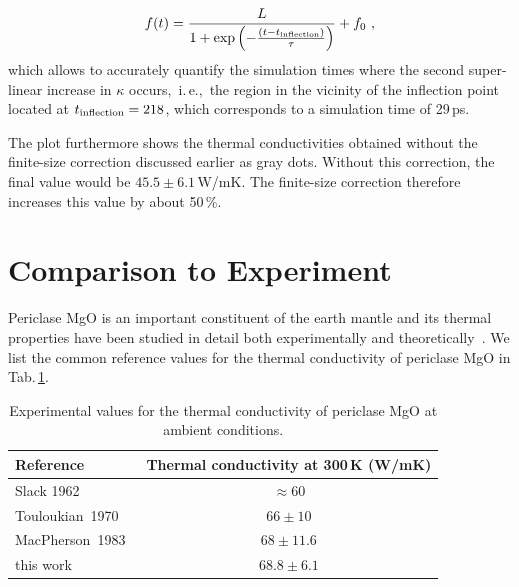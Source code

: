 \begin{align}
	f(t) 
		= \frac{L}{1 + \exp \left(-\frac{(t-t_{\rm inflection})}{\tau} \right)} + f_0~,
	\label{eq:imp.f_logistic}
\end{align}
which allows to accurately quantify the simulation times where the second super-linear increase in $\kappa$ occurs,~i.\,e.,~the region in the vicinity of the inflection point located at $t_{\rm inflection} = 218$, which corresponds to a simulation time of 29\,ps.

The plot furthermore shows the thermal conductivities obtained without the finite-size correction discussed earlier as gray dots. Without this correction, the final value would be $45.5 \pm 6.1$\,W/mK. The finite-size correction therefore increases this value by about 50\,\%.

\section{Comparison to Experiment}
Periclase MgO is an important constituent of the earth mantle and its thermal properties have been studied in detail both experimentally and theoretically~\cite{charvat1957,slack1962,touloukian1970,Macpherson1983,Koker2009,tang2010,dekura2017}. We list the common reference values for the thermal conductivity of periclase MgO in Tab.\,\ref{tab:exp.MgO}.


\begin{table}[ht]
  \centering
  \selectfont
  \begin{tabular}{lc}
    \toprule
    Reference & Thermal conductivity at 300\,K (W/mK)\\
    \midrule
    Slack 1962~\cite{slack1962} & $\approx 60$ \\
    Touloukian~1970~\cite{touloukian1970} & $66 \pm 10$ \\
    MacPherson~1983~\cite{Macpherson1983} & $68 \pm 11.6$ \\
    this work & $68.8 \pm 6.1$ \\
    \bottomrule
  \end{tabular}
  \caption{Experimental values for the thermal conductivity of periclase MgO at ambient conditions.}
  \label{tab:exp.MgO}
\end{table}





